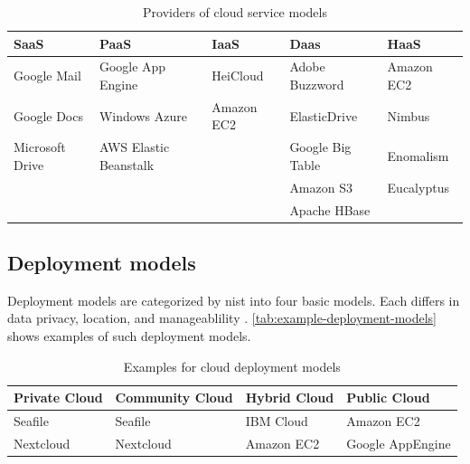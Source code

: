 \begin{table}[h]
    \centering
    \caption{Providers of cloud service models}
    \begin{tabularx}{\linewidth}{X|X|X|X|X}
        \toprule
        \textbf{SaaS}   & \textbf{PaaS}         & \textbf{IaaS} & \textbf{Daas}    & \textbf{HaaS} \\ \hline
        Google Mail     & Google App Engine     & HeiCloud      & Adobe Buzzword   & Amazon EC2    \\
        Google Docs     & Windows Azure         & Amazon EC2    & ElasticDrive     & Nimbus        \\
        Microsoft Drive & AWS Elastic Beanstalk &               & Google Big Table & Enomalism     \\
                        &                       &               & Amazon S3        & Eucalyptus    \\
                        &                       &               & Apache HBase     &               \\
        \bottomrule
    \end{tabularx}
    \label{tab:example-service-models}
\end{table}

\subsection{Deployment models}
\label{subsec:cloud-deployment}

Deployment models are categorized by \ac{nist} into four basic models.
Each differs in data privacy, location, and manageablility \cite{Mell2011}.
\autoref{tab:example-deployment-models} shows examples of such deployment models.

\begin{table}[h]
    \centering
    \caption{Examples for cloud deployment models}
    \begin{tabular}{l|l|l|l}
        \toprule
        \textbf{Private Cloud} & \textbf{Community Cloud} & \textbf{Hybrid Cloud} & \textbf{Public Cloud} \\ \hline
        Seafile                & Seafile                  & IBM Cloud             & Amazon EC2            \\
        Nextcloud              & Nextcloud                & Amazon EC2            & Google AppEngine      \\
        \bottomrule
    \end{tabular}
    \label{tab:example-deployment-models}
\end{table}

